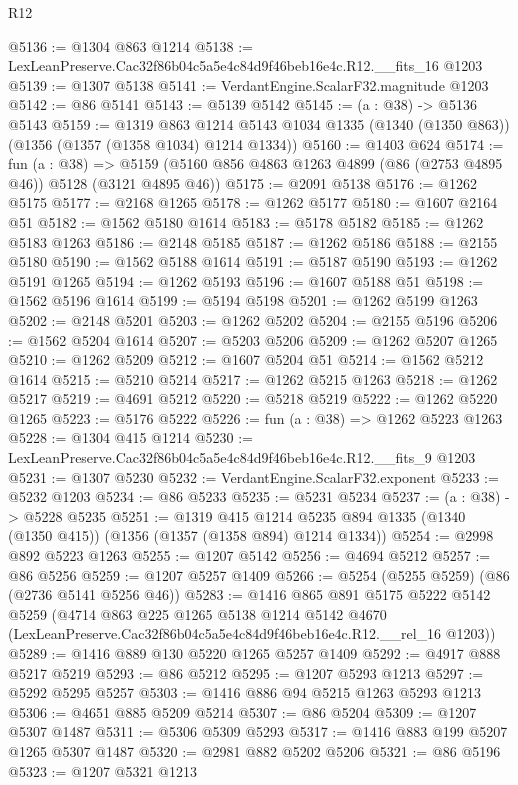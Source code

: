 \begin{lexlean}{R12}
\begin{coremodule}
@5136 := @1304 @863 @1214
@5138 := LexLeanPreserve.Cac32f86b04c5a5e4c84d9f46beb16e4c.R12.__fits_16 @1203
@5139 := @1307 @5138
@5141 := VerdantEngine.ScalarF32.magnitude @1203
@5142 := @86 @5141
@5143 := @5139 @5142
@5145 := (a : @38) -> @5136 @5143
@5159 := @1319
    @863
    @1214
    @5143
    @1034
    @1335
    (@1340 (@1350 @863))
    (@1356 (@1357 (@1358 @1034) @1214 @1334))
@5160 := @1403 @624
@5174 := fun (a : @38) =>
  @5159 (@5160 @856 @4863 @1263 @4899 (@86 (@2753 @4895 @46)) @5128 (@3121 @4895 @46))
@5175 := @2091 @5138
@5176 := @1262 @5175
@5177 := @2168 @1265
@5178 := @1262 @5177
@5180 := @1607 @2164 @51
@5182 := @1562 @5180 @1614
@5183 := @5178 @5182
@5185 := @1262 @5183 @1263
@5186 := @2148 @5185
@5187 := @1262 @5186
@5188 := @2155 @5180
@5190 := @1562 @5188 @1614
@5191 := @5187 @5190
@5193 := @1262 @5191 @1265
@5194 := @1262 @5193
@5196 := @1607 @5188 @51
@5198 := @1562 @5196 @1614
@5199 := @5194 @5198
@5201 := @1262 @5199 @1263
@5202 := @2148 @5201
@5203 := @1262 @5202
@5204 := @2155 @5196
@5206 := @1562 @5204 @1614
@5207 := @5203 @5206
@5209 := @1262 @5207 @1265
@5210 := @1262 @5209
@5212 := @1607 @5204 @51
@5214 := @1562 @5212 @1614
@5215 := @5210 @5214
@5217 := @1262 @5215 @1263
@5218 := @1262 @5217
@5219 := @4691 @5212
@5220 := @5218 @5219
@5222 := @1262 @5220 @1265
@5223 := @5176 @5222
@5226 := fun (a : @38) => @1262 @5223 @1263
@5228 := @1304 @415 @1214
@5230 := LexLeanPreserve.Cac32f86b04c5a5e4c84d9f46beb16e4c.R12.__fits_9 @1203
@5231 := @1307 @5230
@5232 := VerdantEngine.ScalarF32.exponent
@5233 := @5232 @1203
@5234 := @86 @5233
@5235 := @5231 @5234
@5237 := (a : @38) -> @5228 @5235
@5251 := @1319
    @415
    @1214
    @5235
    @894
    @1335
    (@1340 (@1350 @415))
    (@1356 (@1357 (@1358 @894) @1214 @1334))
@5254 := @2998 @892 @5223 @1263
@5255 := @1207 @5142
@5256 := @4694 @5212
@5257 := @86 @5256
@5259 := @1207 @5257 @1409
@5266 := @5254 (@5255 @5259) (@86 (@2736 @5141 @5256 @46))
@5283 := @1416
    @865
    @891
    @5175
    @5222
    @5142
    @5259
    (@4714
      @863
      @225
      @1265
      @5138
      @1214
      @5142
      @4670
      (LexLeanPreserve.Cac32f86b04c5a5e4c84d9f46beb16e4c.R12.__rel_16 @1203))
@5289 := @1416 @889 @130 @5220 @1265 @5257 @1409
@5292 := @4917 @888 @5217 @5219
@5293 := @86 @5212
@5295 := @1207 @5293 @1213
@5297 := @5292 @5295 @5257
@5303 := @1416 @886 @94 @5215 @1263 @5293 @1213
@5306 := @4651 @885 @5209 @5214
@5307 := @86 @5204
@5309 := @1207 @5307 @1487
@5311 := @5306 @5309 @5293
@5317 := @1416 @883 @199 @5207 @1265 @5307 @1487
@5320 := @2981 @882 @5202 @5206
@5321 := @86 @5196
@5323 := @1207 @5321 @1213

\end{coremodule}
\end{lexlean}
